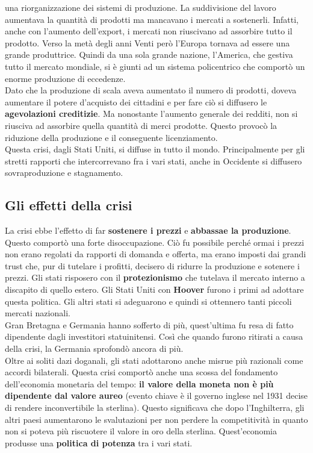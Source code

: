 una riorganizzazione dei sistemi di produzione. La suddivisione del lavoro aumentava la quantità
di prodotti ma mancavano i mercati a sostenerli. Infatti, anche con l'aumento dell'export, i mercati
non riuscivano ad assorbire tutto il prodotto. Verso la metà degli anni Venti però l'Europa tornava
ad essere una grande produttrice. Quindi da una sola grande nazione, l'America, che gestiva tutto
il mercato mondiale, si è giunti ad un sistema policentrico che comportò un enorme produzione di
eccedenze.\\
Dato che la produzione di scala aveva aumentato il numero di prodotti, doveva aumentare il potere
d'acquisto dei cittadini e per fare ciò si diffusero le \textbf{agevolazioni creditizie}. Ma 
nonostante l'aumento generale dei redditi, non si riusciva ad assorbire quella quantità di merci
prodotte. Questo provocò la riduzione della produzione e il conseguente licenziamento.\\
Questa crisi, dagli Stati Uniti, si diffuse in tutto il mondo. Principalmente per gli stretti
rapporti che intercorrevano fra i vari stati, anche in Occidente si diffusero sovraproduzione e
stagnamento.

\subsection{Gli effetti della crisi}
La crisi ebbe l'effetto di far \textbf{sostenere i prezzi} e \textbf{abbassae la produzione}.
Questo comportò una forte disoccupazione. Ciò fu possibile perché ormai i prezzi non erano regolati
da rapporti di domanda e offerta, ma erano imposti dai grandi trust che, pur di tutelare i profitti,
decisero di ridurre la produzione e sotenere i prezzi. Gli stati risposero con il 
\textbf{protezionismo} che tutelava il mercato interno a discapito di quello estero. Gli Stati Uniti
con \textbf{Hoover} furono i primi ad adottare questa politica. Gli altri stati si adeguarono e 
quindi si ottennero tanti piccoli mercati nazionali.\\
Gran Bretagna e Germania hanno sofferto di più, quest'ultima fu resa di fatto dipendente dagli 
investitori statuinitensi. Così che quando furono ritirati a causa della crisi, la Germania sprofondò
ancora di più.\\
Oltre ai soliti dazi doganali, gli stati adottarono anche misrue più razionali come accordi 
bilaterali. Questa crisi comportò anche una scossa del fondamento dell'economia monetaria del tempo:
\textbf{il valore della moneta non è più dipendente dal valore aureo} (evento chiave è il governo 
inglese nel 1931 decise di rendere inconvertibile la sterlina). Questo significava che dopo 
l'Inghilterra, gli altri paesi aumentarono le svalutazioni per non perdere la competitività in quanto
non si poteva più riscuotere il valore in oro della sterlina. Quest'economia produsse una 
\textbf{politica di potenza} tra i vari stati.

